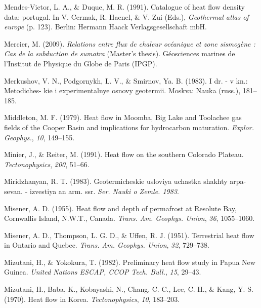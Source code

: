 \documentclass[draft,linenumbers]{agujournal2018}
\begin{document}
\leavevmode{}%
Mendes-Victor, L. A., \& Duque, M. R. (1991). Catalogue of heat flow
density data: portugal. In V. Cermak, R. Haenel, \& V. Zui (Eds.),
\emph{Geothermal atlas of europe} (p. 123). Berlin: Hermann Haack
Verlagsgesellschaft mbH.

\leavevmode{}%
Mercier, M. (2009). \emph{Relations entre flux de chaleur océanique et
zone sismogène : Cas de la subduction de sumatra} (Master's thesis).
Géosciences marines de l'Institut de Physique du Globe de Paris (IPGP).

\leavevmode{}%
Merkushov, V. N., Podgornykh, L. V., \& Smirnov, Ya. B. (1983). I dr. -
v kn.: Metodiches- kie i experimentalnye osnovy geotermii. Moskva: Nauka
(russ.), 181--185.

\leavevmode{}%
Middleton, M. F. (1979). Heat flow in {Moomba, Big Lake and Toolachee}
gas fields of the {Cooper Basin} and implications for hydrocarbon
maturation. \emph{Explor. Geophys.}, \emph{10}, 149--155.

\leavevmode{}%
Minier, J., \& Reiter, M. (1991). Heat flow on the southern {Colorado
Plateau}. \emph{Tectonophysics}, \emph{200}, 51--66.

\leavevmode{}%
Miridzhanyan, R. T. (1983). Geotermicheskie usloviya uchastka shakhty
arpa- sevan. - izvestiya an arm. ssr. \emph{Ser. Nauki o Zemle. 1983}.

\leavevmode{}%
Misener, A. D. (1955). Heat flow and depth of permafrost at {Resolute
Bay, Cornwallis Island, N.W.T., Canada}. \emph{Trans. Am. Geophys.
Union}, \emph{36}, 1055--1060.

\leavevmode{}%
Misener, A. D., Thompson, L. G. D., \& Uffen, R. J. (1951). Terrestrial
heat flow in {Ontario and Quebec}. \emph{Trans. Am. Geophys. Union},
\emph{32}, 729--738.

\leavevmode{}%
Mizutani, H., \& Yokokura, T. (1982). Preliminary heat flow study in
{Papua New Guinea}. \emph{United Nations ESCAP, CCOP Tech. Bull.},
\emph{15}, 29--43.

\leavevmode{}%
Mizutani, H., Baba, K., Kobayashi, N., Chang, C. C., Lee, C. H., \&
Kang, Y. S. (1970). Heat flow in {Korea}. \emph{Tectonophysics},
\emph{10}, 183--203.
\end{document}
